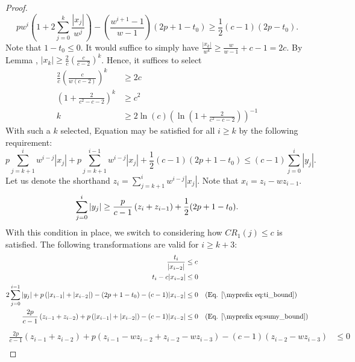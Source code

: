 \begin{appendixonly}
\begin{proof}
\begin{equation*}
    pw^i\left(1 + 2\sum_{j=0}^{k}\frac{|x_j|}{w^j}\right) - \left(\frac{w^{i+1}-1}{w-1}\right)(2p+1-t_0) \geq \frac12(c-1)(2p-t_0) .
  \end{equation*}
  Note that $1-t_0\leq 0$.
  It would suffice to simply have $\frac{|x_k|}{w^k} \geq \frac{w}{w-1}+c-1 = 2c$. By Lemma , $|x_k|\geq \frac{2}{c}\left(\frac{c}{c-2}\right)^k$. Hence, it suffices to select
  \begin{align*}
    \frac{2}{c}\left(\frac{c}{w(c-2)}\right)^k &\geq 2c \\
    \left(1+\frac{2}{c^2-c-2}\right)^k &\geq c^2 \\
    k &\geq 2\ln\left(c\right)\left(\ln\left(1+\frac{2}{c^2-c-2}\right)\right)^{-1}
  \end{align*}
  With such a $k$ selected, Equation  may be satisfied for all $i\geq k$ by the following requirement:
  \begin{equation*}
    p\sum_{j=k+1}^{i}w^{i-j}|x_j| + p\sum_{j=k+1}^{i-1}w^{i-j}|x_j| + \frac12(c-1)(2p+1-t_0) \leq (c-1)\sum_{j=0}^{i}|y_j| .
  \end{equation*}
  Let us denote the shorthand $z_i = \sum_{j=k+1}^{i}w^{i-j}|x_j|$. Note that $x_i = z_i - wz_{i-1}$.
  \begin{equation}
    \sum_{j=0}^{i}|y_j| \geq \frac{p}{c-1}\left(z_i + z_{i-1}\right) + \frac12(2p+1-t_0) . \mylabel{eq:sumy_bound}
  \end{equation}
  With this condition in place, we switch to considering how $CR_1(j)\leq c$ is satisfied. The following transformations are valid for $i\geq k+3$:
  \begin{align*}
    \frac{t_i}{|x_{i-2}|} &\leq c \\
    t_i - c|x_{i-2}| &\leq 0 \\
    2\sum_{j=0}^{i-1}|y_j| + p\left(|x_{i-1}|+|x_{i-2}|\right) - (2p+1-t_0) - (c-1)|x_{i-2}| &\leq 0 \quad\text{(Eq. \myeqref{eq:ti_bound})}\\
    \frac{2p}{c-1}\left(z_{i-1} + z_{i-2}\right) + p\left(|x_{i-1}|+|x_{i-2}|\right) - (c-1)|x_{i-2}| &\leq 0 \quad\text{(Eq. \myeqref{eq:sumy_bound})}
  \end{align*}
  \begin{align*}
    \frac{2p}{c-1}\left(z_{i-1} + z_{i-2}\right) + p\left(z_{i-1}-wz_{i-2}+z_{i-2}-wz_{i-3}\right) - (c-1)\left(z_{i-2}-wz_{i-3}\right) &\leq 0 \\

\end{align*}
\end{proof}
\end{appendixonly}
